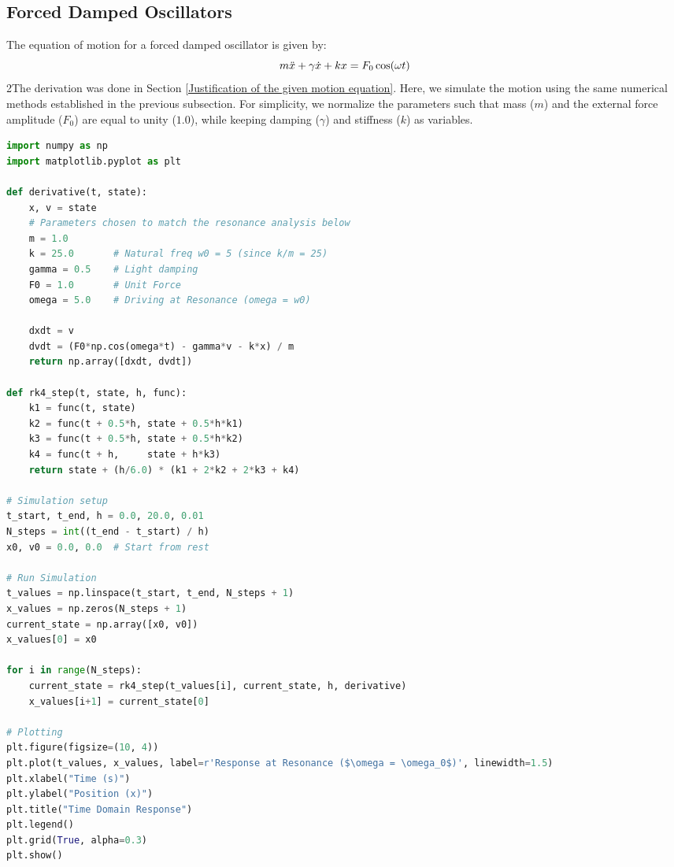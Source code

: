 \documentclass[10pt,twoside]{report}
\begin{document}
\subsection{Forced Damped Oscillators}
The equation of motion for a forced damped oscillator is given by:
\begin{equation*}
      m\ddot{x} +\gamma\dot{x} + kx =  F_0\cos(\omega t)\\[8pt]
\end{equation*}
2The derivation was done in Section \ref{Justification of the given motion equation}. Here, we simulate the motion using the same numerical methods established in the previous subsection. For simplicity, we normalize the parameters such that mass ($m$) and the external force amplitude ($F_0$) are equal to unity ($1.0$), while keeping damping ($\gamma$) and stiffness ($k$) as variables.


\begin{lstlisting}[language=Python, title={RK4 Time-Domain Simulation}, frame=single]
import numpy as np
import matplotlib.pyplot as plt

def derivative(t, state):
    x, v = state
    # Parameters chosen to match the resonance analysis below
    m = 1.0
    k = 25.0       # Natural freq w0 = 5 (since k/m = 25)
    gamma = 0.5    # Light damping
    F0 = 1.0       # Unit Force
    omega = 5.0    # Driving at Resonance (omega = w0)
    
    dxdt = v
    dvdt = (F0*np.cos(omega*t) - gamma*v - k*x) / m
    return np.array([dxdt, dvdt])

def rk4_step(t, state, h, func):
    k1 = func(t, state)
    k2 = func(t + 0.5*h, state + 0.5*h*k1)
    k3 = func(t + 0.5*h, state + 0.5*h*k2)
    k4 = func(t + h,     state + h*k3)
    return state + (h/6.0) * (k1 + 2*k2 + 2*k3 + k4)

# Simulation setup
t_start, t_end, h = 0.0, 20.0, 0.01     
N_steps = int((t_end - t_start) / h)
x0, v0 = 0.0, 0.0  # Start from rest

# Run Simulation
t_values = np.linspace(t_start, t_end, N_steps + 1)
x_values = np.zeros(N_steps + 1)
current_state = np.array([x0, v0])
x_values[0] = x0

for i in range(N_steps):
    current_state = rk4_step(t_values[i], current_state, h, derivative)
    x_values[i+1] = current_state[0]

# Plotting
plt.figure(figsize=(10, 4))
plt.plot(t_values, x_values, label=r'Response at Resonance ($\omega = \omega_0$)', linewidth=1.5)
plt.xlabel("Time (s)")
plt.ylabel("Position (x)")
plt.title("Time Domain Response")
plt.legend()
plt.grid(True, alpha=0.3)
plt.show()
\end{lstlisting}
\end{document}
